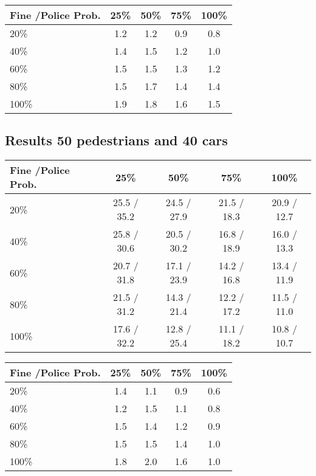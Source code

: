 \documentclass[a4paper]{article}
\begin{document}
\begin{table}[H]
\centering
\begin{tabular}{ l | c c c c }
  Fine \slash Police Prob. & 25\% & 50\% & 75\% & 100\% \\ 
  \hline
  20\%  & 1.2 & 1.2 & 0.9 & 0.8  \\
  40\%  & 1.4 & 1.5 & 1.2 & 1.0  \\
  60\%  & 1.5 & 1.5 & 1.3 & 1.2  \\
  80\%  & 1.5 & 1.7 & 1.4 & 1.4  \\
  100\% & 1.9 & 1.8 & 1.6 & 1.5  \\
\end{tabular}
\end{table}

\subsection{Results 50 pedestrians and 40 cars}
\begin{table}[H]
\centering
\begin{tabular}{ l | c c c c }
  Fine \slash Police Prob. & 25\% & 50\% & 75\% & 100\% \\ 
  \hline
  20\%  & 25.5 / 35.2 & 24.5 / 27.9 & 21.5 / 18.3 & 20.9 / 12.7  \\
  40\%  & 25.8 / 30.6 & 20.5 / 30.2 & 16.8 / 18.9 & 16.0 / 13.3  \\
  60\%  & 20.7 / 31.8 & 17.1 / 23.9 & 14.2 / 16.8 & 13.4 / 11.9  \\
  80\%  & 21.5 / 31.2 & 14.3 / 21.4 & 12.2 / 17.2 & 11.5 / 11.0  \\
  100\% & 17.6 / 32.2 & 12.8 / 25.4 & 11.1 / 18.2 & 10.8 / 10.7  \\
\end{tabular}
\end{table}

\begin{table}[H]
\centering
\begin{tabular}{ l | c c c c }
  Fine \slash Police Prob. & 25\% & 50\% & 75\% & 100\% \\ 
  \hline
  20\%  & 1.4 & 1.1 & 0.9 & 0.6  \\
  40\%  & 1.2 & 1.5 & 1.1 & 0.8  \\
  60\%  & 1.5 & 1.4 & 1.2 & 0.9  \\
  80\%  & 1.5 & 1.5 & 1.4 & 1.0  \\
  100\% & 1.8 & 2.0 & 1.6 & 1.0  \\
\end{tabular}
\end{table}
\end{document}
